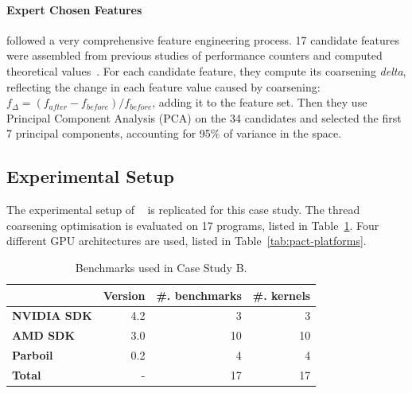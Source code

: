 

\paragraph*{Expert Chosen Features}

\citeauthor{Magni2014} followed a very comprehensive feature engineering process. 17 candidate features were assembled from previous studies of performance counters and computed theoretical values~\cite{Magni2,Sim2012}. For each candidate feature, they compute its coarsening \emph{delta}, reflecting the change in each feature value caused by coarsening: $f_{\Delta} = (f_{after} - f_{before}) / f_{before}$, adding it to the feature set. Then they use Principal Component Analysis (PCA) on the 34 candidates and selected the first 7 principal components, accounting for 95\% of variance in the space.

\subsection{Experimental Setup}

The experimental setup of \citeauthor{Magni2014}~\cite{Magni2014} is replicated for this case study. The thread coarsening optimisation is evaluated on 17 programs, listed in Table~\ref{tab:pact-benchmarks}. Four different GPU architectures are used, listed in Table~\ref{tab:pact-platforms}.

\begin{table}
  \centering %
  \begin{tabular}{| l r r r |}
    \hline
    \rowcolor{gray!50}
    & \textbf{Version} & \textbf{\#. benchmarks} & \textbf{\#. kernels}\\
    \hline
    \textbf{NVIDIA SDK} & 4.2 & 3 & 3 \\
    \textbf{AMD SDK} & 3.0 & 10 & 10 \\
    \textbf{Parboil~\cite{Stratton2012}} & 0.2 & 4 & 4 \\
    \textbf{Total} & - & 17 & 17 \\
    \hline
  \end{tabular}
  \caption[Benchmarks used in Case Study B]{%
    Benchmarks used in Case Study B.%
  }
  \label{tab:pact-benchmarks}
\end{table}

